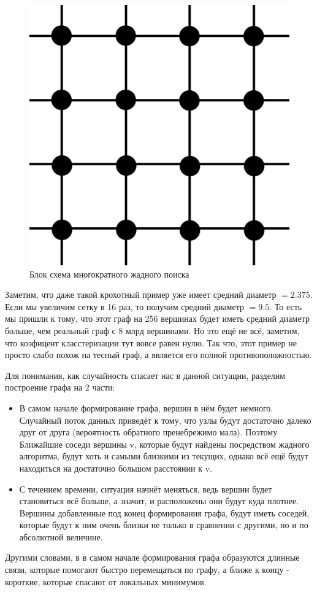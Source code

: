 \begin{figure}[H]
    \centering
    \includegraphics[scale=0.1]{./pictures/Square_grid_graph.svg.png}
    \caption{Блок схема многократного жадного поиска} \label{lattice}
\end{figure}

Заметим, что даже такой крохотный пример уже имеет средний диаметр $= 2.375$.
Если мы увеличим сетку в 16 раз, то получим средний диаметр $= 9.5$. То есть мы пришли к тому,
что этот граф на 256 вершинах будет иметь средний диаметр больше, чем реальный
граф с 8 млрд вершинами. Но это ещё не всё, заметим, что коэфицент класстеризации тут 
вовсе равен нулю. Так что, этот пример не просто слабо похож на тесный граф, а является 
его полной противоположностью.

Для понимания, как случайность спасает нас в данной ситуации, разделим построение
графа на 2 части:
\begin{itemize}
    \item В самом начале формирование графа, вершин в нём будет немного. Случайный поток данных
    приведёт к тому, что узлы будут достаточно далеко друг от друга (вероятность
    обратного пренебрежимо мала). Поэтому Ближайшие соседи вершины v, которые будут найдены
    посредством жадного алгоритма, будут хоть и самыми близкими из текущих, однако всё
    ещё будут находиться на достаточно большом расстоянии к v. 
    \item С течением времени, ситуация начнёт меняться, ведь вершин будет становиться всё больше,
    а значит, и расположены они будут куда плотнее. Вершины добавленные под конец формирования графа,
    будут иметь соседей, которые будут к ним очень близки не только в сравнении с другими, но и
    по абсолютной величине.
\end{itemize}

Другими словами, в в самом начале формирования графа образуются длинные связи, которые помогают
быстро перемещаться по графу, а ближе к концу - короткие, которые спасают от локальных минимумов.